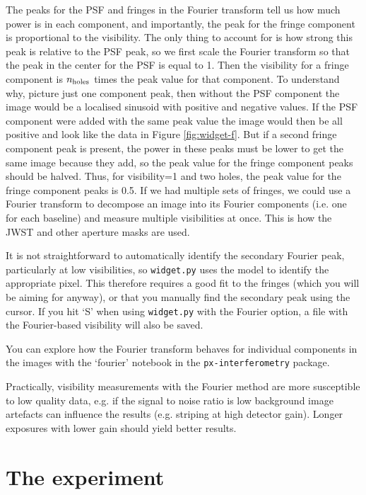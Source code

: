 \documentclass[11pt]{article}
\begin{document}
The peaks for the PSF and fringes in the Fourier transform tell us how much power is in each component, and importantly, the peak for the fringe component is proportional to the visibility. The only thing to account for is how strong this peak is relative to the PSF peak, so we first scale the Fourier transform so that the peak in the center for the PSF is equal to 1. Then the visibility for a fringe component is $n_{\rm holes}$ times the peak value for that component. To understand why, picture just one component peak, then without the PSF component the image would be a localised sinusoid with positive and negative values. If the PSF component were added with the same peak value the image would then be all positive and look like the data in Figure \ref{fig:widget-f}. But if a second fringe component peak is present, the power in these peaks must be lower to get the same image because they add, so the peak value for the fringe component peaks should be halved. Thus, for visibility=1 and two holes, the peak value for the fringe component peaks is 0.5. If we had multiple sets of fringes, we could use a Fourier transform to decompose an image into its Fourier components (i.e. one for each baseline) and measure multiple visibilities at once. This is how the JWST and other aperture masks are used.

It is not straightforward to automatically identify the secondary Fourier peak, particularly at low visibilities, so \texttt{widget.py} uses the model to identify the appropriate pixel. This therefore requires a good fit to the fringes (which you will be aiming for anyway), or that you manually find the secondary peak using the cursor. If you hit `S' when using \texttt{widget.py} with the Fourier option, a file with the Fourier-based visibility will also be saved.

You can explore how the Fourier transform behaves for individual components in the images with the `fourier' notebook in the \texttt{px-interferometry} package.

Practically, visibility measurements with the Fourier method are more susceptible to low quality data, e.g. if the signal to noise ratio is low background image artefacts can influence the results (e.g. striping at high detector gain). Longer exposures with lower gain should yield better results. 

\clearpage

\section{The experiment}
\end{document}
